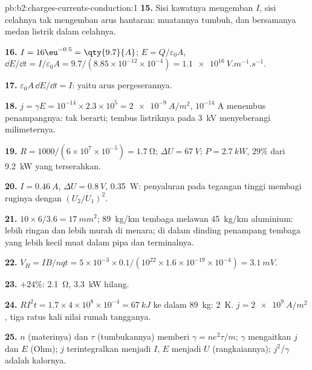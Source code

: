 \begin{solution}{pb:b2:charges-currents-conduction:1}
\textbf{15.} Sisi kawatnya mengemban $I$, sisi celahnya tak mengemban arus
hantaran: muatannya tumbuh, dan bersamanya medan listrik dalam celahnya.

\textbf{16.} $I = 16\eu^{-0.5} = \qty{9.7}{A}$; $E = Q/\varepsilon_0A$, $\dd E/\dd t = I/\varepsilon_0A
= 9.7/(8.85 \times 10^{-12} \times 10^{-4}) = \qty{1.1e16}{V.m^{-1}.s^{-1}}$.

\textbf{17.} $\varepsilon_0A\,\dd E/\dd t = I$: yaitu arus pergeserannya.

\textbf{18.} $j = \gamma E = 10^{-14} \times 2.3 \times 10^5 = \qty{2e-9}{A/m^2}$, $10^{-14}$ A
menembus penampangnya: tak berarti; tembus listriknya pada \qty{3}{kV} menyeberangi milimeternya.

\textbf{19.} $R = 1000/(6 \times 10^7 \times 10^{-5}) = \qty{1.7}{\ohm}$; $\Delta U = \qty{67}{V}$; $P =
\qty{2.7}{kW}$, $29\%$ dari \qty{9.2}{kW} yang terserahkan.

\textbf{20.} $I = \qty{0.46}{A}$, $\Delta U = \qty{0.8}{V}$, \qty{0.35}{W}: penyaluran pada
tegangan tinggi membagi ruginya dengan $(U_2/U_1)^2$.

\textbf{21.} $10 \times 6/3.6 = \qty{17}{mm^2}$; \qty{89}{kg/km} tembaga melawan
\qty{45}{kg/km} aluminium: lebih ringan dan lebih murah di menara; di dalam dinding
penampang tembaga yang lebih kecil muat dalam pipa dan terminalnya.

\textbf{22.} $V_H = IB/nqt = 5 \times 10^{-3} \times 0.1/(10^{22} \times 1.6 \times 10^{-19} \times 10^{-4}) =
\qty{3.1}{mV}$.

\textbf{23.} $+24\%$: \qty{2.1}{\ohm}, \qty{3.3}{kW} hilang.

\textbf{24.} $RI^2t = 1.7 \times 4 \times 10^8 \times 10^{-4} = \qty{67}{kJ}$ ke dalam \qty{89}{kg}: \qty{2}{K}.
$j = \qty{2e9}{A/m^2}$, tiga ratus kali nilai rumah tangganya.

\textbf{25.} $n$ (materinya) dan $\tau$ (tumbukannya) memberi $\gamma = ne^2\tau/m$;
$\gamma$ mengaitkan $j$ dan $E$ (Ohm); $j$ terintegralkan menjadi $I$, $E$ menjadi $U$ (rangkaiannya);
$j^2/\gamma$ adalah kalornya.
\end{solution}
